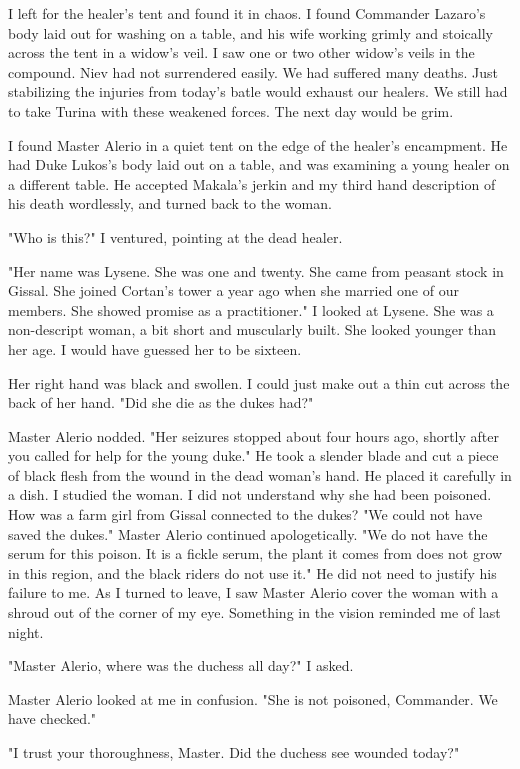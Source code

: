 \documentclass{article}
\begin{document}
I left for the healer's tent and found it in chaos. I found Commander Lazaro's body laid out for washing on a table, and his wife working grimly and stoically across the tent in a widow's veil. I saw one or two other widow's veils in the compound. Niev had not surrendered easily. We had suffered many deaths. Just stabilizing the injuries from today's batle would exhaust our healers. We still had to take Turina with these weakened forces. The next day would be grim. 

I found Master Alerio in a quiet tent on the edge of the healer's encampment. He had Duke Lukos's body laid out on a table, and was examining a young healer on a different table. He accepted Makala's jerkin and my third hand description of his death wordlessly, and turned back to the woman.

"Who is this?" I ventured, pointing at the dead healer.

"Her name was Lysene. She was one and twenty. She came from peasant stock in Gissal. She joined Cortan's tower a year ago when she married one of our members. She showed promise as a practitioner." I looked at Lysene. She was a non-descript woman, a bit short and muscularly built. She looked younger than her age. I would have guessed her to be sixteen.

Her right hand was black and swollen. I could just make out a thin cut across the back of her hand. "Did she die as the dukes had?"

Master Alerio nodded. "Her seizures stopped about four hours ago, shortly after you called for help for the young duke." He took a slender blade and cut a piece of black flesh from the wound in the dead woman's hand. He placed it carefully in a dish. I studied the woman. I did not understand why she had been poisoned. How was a farm girl from Gissal connected to the dukes? "We could not have saved the dukes." Master Alerio continued apologetically. "We do not have the serum for this poison. It is a fickle serum, the plant it comes from does not grow in this region, and the black riders do not use it." He did not need to justify his failure to me. As I turned to leave, I saw Master Alerio cover the woman with a shroud out of the corner of my eye. Something in the vision reminded me of last night.

"Master Alerio, where was the duchess all day?" I asked.

Master Alerio looked at me in confusion. "She is not poisoned, Commander. We have checked."

"I trust your thoroughness, Master. Did the duchess see wounded today?"
\end{document}
